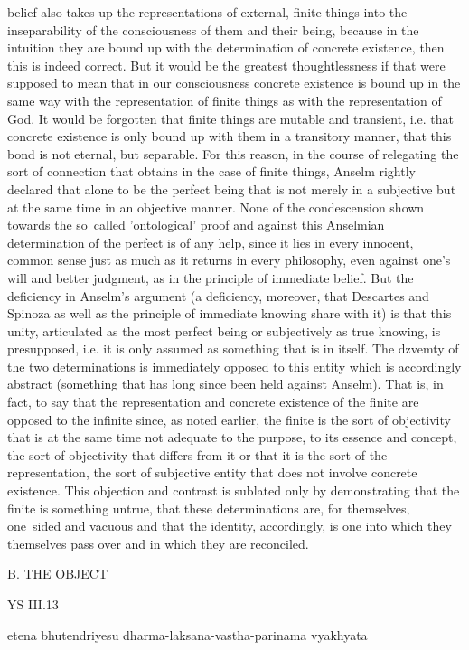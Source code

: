 belief also takes up the representations of external, finite
things into the inseparability of the consciousness of them and
their being, because in the intuition they are bound up with the
determination of concrete existence, then this is indeed correct. But
it would be the greatest thoughtlessness if that were supposed to
mean that in our consciousness concrete existence is bound up in
the same way with the representation of finite things as with the
representation of God. It would be forgotten that finite things are
mutable and transient, i.e. that concrete existence is only bound up
with them in a transitory manner, that this bond is not eternal, but
separable. For this reason, in the course of relegating the sort of
connection that obtains in the case of finite things,
Anselm rightly declared that alone to be the perfect being that is not
merely in a subjective but at the same time in an objective manner.
None of the condescension shown towards the so~called 'ontological'
proof and against this Anselmian determination of the perfect is of
any help, since it lies in every innocent, common sense just as much
as it returns in every philosophy, even against one's will and better
judgment, as in the principle of immediate belief.
But the deficiency in Anselm's argument (a deficiency, moreover,
that Descartes and Spinoza as well as the principle of immediate
knowing share with it) is that this unity, articulated as the most
perfect being or subjectively as true knowing, is
presupposed, i.e. it is only assumed as something that is in itself.
The dzvemty of the two determinations is immediately opposed to this
entity which is accordingly abstract
(something that has long since been held against Anselm).
That is, in fact, to say that the
representation and concrete existence of the finite are opposed to
the infinite since, as noted earlier, the finite is the sort of objectivity
that is at the same time not adequate to the purpose, to its essence
and concept, the sort of objectivity that differs from it or that it
is the sort of the representation, the sort of subjective entity that
does not involve concrete existence.
This objection and contrast is
sublated only by demonstrating that the finite is something untrue,
that these determinations are, for themselves, one~sided and vacuous
and that the identity, accordingly, is one into which they themselves
pass over and in which they are reconciled.

B. THE OBJECT

YS III.13

etena bhutendriyesu dharma-laksana-vastha-parinama vyakhyata

